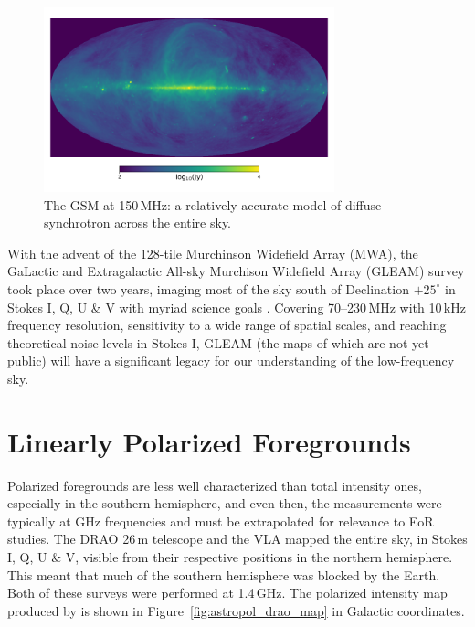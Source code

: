 \begin{figure}
\centering
\includegraphics[width=0.75\textwidth]{chapters/astropol/figures/gsm.png}
\caption{The GSM at 150\,MHz: a relatively accurate model of diffuse synchrotron across the entire sky.}
\label{fig:astropol_gsm}
\end{figure}

With the advent of the 128-tile Murchinson Widefield Array (MWA), the GaLactic and Extragalactic All-sky Murchison Widefield Array (GLEAM) survey took place over two years, imaging most of the sky south of Declination $+25^{\circ}$ in Stokes I, Q, U \& V with myriad science goals \citep{Bowman.13, Wayth.15, Hurley-Walker.17}. Covering 70--230\,MHz with 10\,kHz frequency resolution, sensitivity to a wide range of spatial scales, and reaching theoretical noise levels in Stokes I, GLEAM (the maps of which are not yet public) will have a significant legacy for our understanding of the low-frequency sky. 

\section{Linearly Polarized Foregrounds}
\label{sec:astropol_linpol_fgs}
Polarized foregrounds are less well characterized than total intensity ones, especially in the southern hemisphere, and even then, the measurements were typically at GHz frequencies and must be extrapolated for relevance to EoR studies. The DRAO 26\,m \citep{Wolleben.06} telescope and the VLA \citep{Condon.98} mapped the entire sky, in Stokes I, Q, U \& V, visible from their respective positions in the northern hemisphere. This meant that much of the southern hemisphere was blocked by the Earth. Both of these surveys were performed at 1.4\,GHz. The polarized intensity map produced by \cite{Wolleben.06} is shown in Figure~\ref{fig:astropol_drao_map} in Galactic coordinates.


